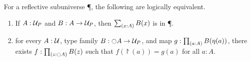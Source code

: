 \documentclass[hott-all.tex]{subfiles}
\begin{document}
% 
% 
% 
\begin{thm}
  For a reflective subuniverse \P, the following are logically equivalent.
  \begin{enumerate}
  \item If $A:\P$ and $B:A\to \P$, then $\sm{x:A} B(x)$ is in \P.
  \item for every $A:\type$, type family $B:\reflect A\to\P$, and map $g:\prd{a:A} B(\project(a))$, there exists $f:\prd{z:\reflect A} B(z)$ such that $f(\project(a)) = g(a)$ for all $a:A$.
  \end{enumerate}
\end{thm}
% 
% 
\end{document}
